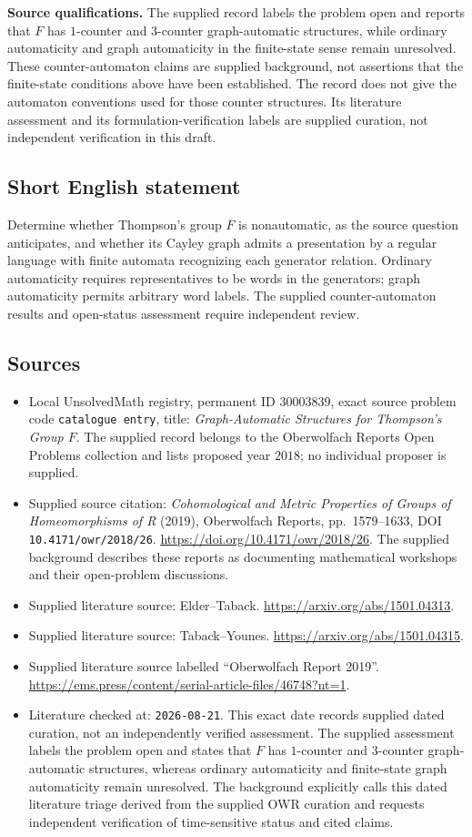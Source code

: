 \documentclass[11pt]{article}
\begin{document}
\textbf{Source qualifications.} The supplied record labels the problem open and reports that \(F\) has \(1\)-counter and \(3\)-counter graph-automatic structures, while ordinary automaticity and graph automaticity in the finite-state sense remain unresolved. These counter-automaton claims are supplied background, not assertions that the finite-state conditions above have been established. The record does not give the automaton conventions used for those counter structures. Its literature assessment and its formulation-verification labels are supplied curation, not independent verification in this draft.
\subsection{Short English statement}
Determine whether Thompson's group \(F\) is nonautomatic, as the source question anticipates, and whether its Cayley graph admits a presentation by a regular language with finite automata recognizing each generator relation. Ordinary automaticity requires representatives to be words in the generators; graph automaticity permits arbitrary word labels. The supplied counter-automaton results and open-status assessment require independent review.
\subsection{Sources}
\begin{itemize}
\item Local UnsolvedMath registry, permanent ID \(30003839\), exact source problem code \texttt{catalogue entry}, title: \emph{Graph-Automatic Structures for Thompson's Group \(F\)}. The supplied record belongs to the Oberwolfach Reports Open Problems collection and lists proposed year \(2018\); no individual proposer is supplied.
\item Supplied source citation: \emph{Cohomological and Metric Properties of Groups of Homeomorphisms of R} (2019), Oberwolfach Reports, pp.\ 1579--1633, DOI \texttt{10.4171/owr/2018/26}. \url{https://doi.org/10.4171/owr/2018/26}. The supplied background describes these reports as documenting mathematical workshops and their open-problem discussions.
\item Supplied literature source: Elder--Taback. \url{https://arxiv.org/abs/1501.04313}.
\item Supplied literature source: Taback--Younes. \url{https://arxiv.org/abs/1501.04315}.
\item Supplied literature source labelled ``Oberwolfach Report 2019''. \url{https://ems.press/content/serial-article-files/46748?nt=1}.
\item Literature checked at: \texttt{2026-08-21}. This exact date records supplied dated curation, not an independently verified assessment. The supplied assessment labels the problem open and states that \(F\) has \(1\)-counter and \(3\)-counter graph-automatic structures, whereas ordinary automaticity and finite-state graph automaticity remain unresolved. The background explicitly calls this dated literature triage derived from the supplied OWR curation and requests independent verification of time-sensitive status and cited claims.
\end{itemize}
\end{document}
